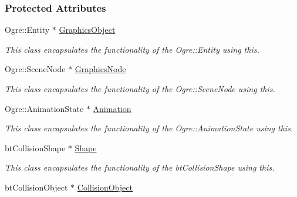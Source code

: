 \subsubsection*{Protected Attributes}
\begin{DoxyCompactItemize}
\item 
\hypertarget{classphys_1_1ActorBase_a25f3811fa1b2206dbabfaa2d6eb97784}{
Ogre::Entity $\ast$ \hyperlink{classphys_1_1ActorBase_a25f3811fa1b2206dbabfaa2d6eb97784}{GraphicsObject}}
\label{classphys_1_1ActorBase_a25f3811fa1b2206dbabfaa2d6eb97784}

\begin{DoxyCompactList}\small\item\em This class encapsulates the functionality of the Ogre::Entity using this. \item\end{DoxyCompactList}\item 
\hypertarget{classphys_1_1ActorBase_a7262c31023ff41a027206e47befc7417}{
Ogre::SceneNode $\ast$ \hyperlink{classphys_1_1ActorBase_a7262c31023ff41a027206e47befc7417}{GraphicsNode}}
\label{classphys_1_1ActorBase_a7262c31023ff41a027206e47befc7417}

\begin{DoxyCompactList}\small\item\em This class encapsulates the functionality of the Ogre::SceneNode using this. \item\end{DoxyCompactList}\item 
\hypertarget{classphys_1_1ActorBase_aed2853b0a97e12aa73f6167aa572e5f3}{
Ogre::AnimationState $\ast$ \hyperlink{classphys_1_1ActorBase_aed2853b0a97e12aa73f6167aa572e5f3}{Animation}}
\label{classphys_1_1ActorBase_aed2853b0a97e12aa73f6167aa572e5f3}

\begin{DoxyCompactList}\small\item\em This class encapsulates the functionality of the Ogre::AnimationState using this. \item\end{DoxyCompactList}\item 
\hypertarget{classphys_1_1ActorBase_a643613ce7abb4b6d4352bab036b7cf69}{
btCollisionShape $\ast$ \hyperlink{classphys_1_1ActorBase_a643613ce7abb4b6d4352bab036b7cf69}{Shape}}
\label{classphys_1_1ActorBase_a643613ce7abb4b6d4352bab036b7cf69}

\begin{DoxyCompactList}\small\item\em This class encapsulates the functionality of the btCollisionShape using this. \item\end{DoxyCompactList}\item 
\hypertarget{classphys_1_1ActorBase_a70676c52ffee64705a7b463d29b60429}{
btCollisionObject $\ast$ \hyperlink{classphys_1_1ActorBase_a70676c52ffee64705a7b463d29b60429}{CollisionObject}}
\label{classphys_1_1ActorBase_a70676c52ffee64705a7b463d29b60429}


\end{DoxyCompactItemize}
